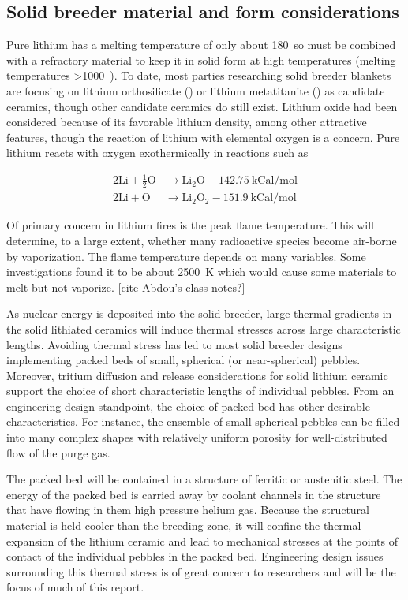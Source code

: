 \subsection{Solid breeder material and form considerations}
Pure lithium has a melting temperature of only about 180~\celsius so must be combined with a refractory material to keep it in solid form at high temperatures (melting temperatures >1000~\celsius). To date, most parties researching solid breeder blankets are focusing on lithium orthosilicate (\lis) or lithium metatitanite (\lit) as candidate ceramics, though other candidate ceramics do still exist. Lithium oxide had been considered because of its favorable lithium density, among other attractive features, though the reaction of lithium with elemental oxygen is a concern. Pure lithium reacts with oxygen exothermically in reactions such as

\begin{subequations}
\begin{align}
	2\mathrm{Li} + \frac{1}{2}\mathrm{O} &\rightarrow \mathrm{Li}_2\mathrm{O} - 142.75~\text{kCal/mol}\\
	2\mathrm{Li} + \mathrm{O} &\rightarrow \mathrm{Li}_2\mathrm{O}_2 - 151.9~\text{kCal/mol}
\end{align}
\end{subequations}

Of primary concern in lithium fires is the peak flame temperature. This will determine, to a large extent, whether many radioactive species become air-borne by vaporization. The flame temperature depends on many variables. Some investigations found it to be about 2500~K which would cause some materials to melt but not vaporize. [cite Abdou's class notes?]

As nuclear energy is deposited into the solid breeder, large thermal gradients in the solid lithiated ceramics will induce thermal stresses across large characteristic lengths. Avoiding thermal stress has led to most solid breeder designs implementing packed beds of small, spherical (or near-spherical) pebbles. Moreover, tritium diffusion and release considerations for solid lithium ceramic support the choice of short characteristic lengths of individual pebbles. From an engineering design standpoint, the choice of packed bed has other desirable characteristics. For instance, the ensemble of small spherical pebbles can be filled into many complex shapes with relatively uniform porosity for well-distributed flow of the purge gas. 

The packed bed will be contained in a structure of ferritic or austenitic steel. The energy of the packed bed is carried away by coolant channels in the structure that have flowing in them high pressure helium gas. Because the structural material is held cooler than the breeding zone, it will confine the thermal expansion of the lithium ceramic and lead to mechanical stresses at the points of contact of the individual pebbles in the packed bed. Engineering design issues surrounding this thermal stress is of great concern to researchers and will be the focus of much of this report.

